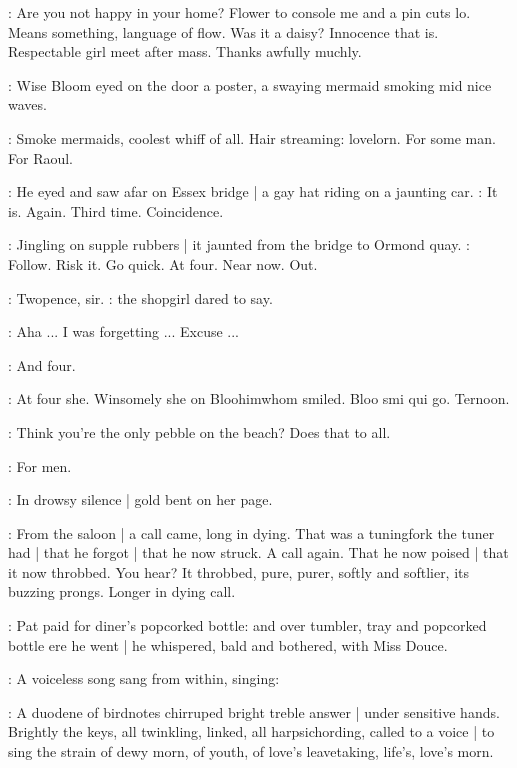 \BloomInt:
Are you not happy in your home?
Flower to console me and a pin cuts lo.
Means something,
language of flow.
Was it a daisy?
Innocence that is.
Respectable girl meet after mass.
Thanks awfully muchly.

:
Wise Bloom eyed on the door a poster,
a swaying mermaid smoking mid nice waves.

\BloomInt:
Smoke mermaids,
coolest whiff of all.
Hair streaming:
lovelorn.
For some man.
For Raoul.

:
He eyed and saw afar on Essex bridge |
a gay hat riding on a jaunting car.
\BloomInt:
It is.
Again.
Third time.
Coincidence.

:
Jingling on supple rubbers |
it jaunted from the bridge to Ormond quay.
\BloomInt:
Follow.
Risk it.
Go quick.
At four.
Near now.
Out.

\shopgirl:
Twopence,
sir.
:
the shopgirl dared to say.

\Bloom:
Aha ...
I was forgetting ...
Excuse ...

\shopgirl:
And four.

\BloomInt:
At four she.
Winsomely she on Bloohimwhom smiled.
Bloo smi qui go.
Ternoon.

\BloomInt:
Think you're the only pebble on the beach?
Does that to all.

\BloomInt:
For men.

:
In drowsy silence |
gold bent on her page.

:
From the saloon |
a call came,
long in dying.
That was a tuningfork the tuner had |
that he forgot |
that he now struck.
A call again.
That he now poised |
that it now throbbed.
You hear?
It throbbed,
pure,
purer,
softly and softlier,
its buzzing prongs.
Longer in dying call.

:
Pat paid for diner's popcorked bottle:
and over tumbler,
tray and popcorked bottle ere he went |
he whispered,
bald and bothered,
with Miss Douce.


:
A voiceless song sang from within,
singing:


:
A duodene of birdnotes chirruped bright treble answer |
under sensitive hands.
Brightly the keys,
all twinkling,
linked,
all harpsichording,
called to a voice |
to sing the strain of dewy morn,
of youth,
of love's leavetaking,
life's,
love's morn.

